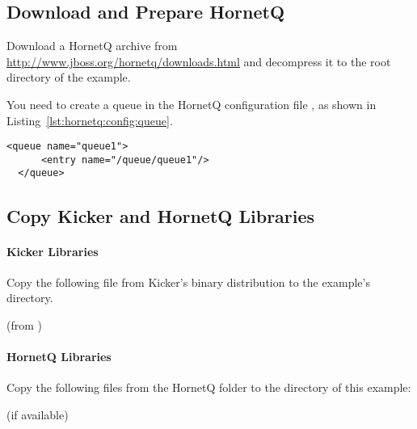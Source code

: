 \subsection{Download and Prepare HornetQ}

Download a HornetQ archive from \url{http://www.jboss.org/hornetq/downloads.html} %
and decompress it to the root directory of the example. 

\noindent You need to create a queue in the HornetQ configuration file %
, as shown in Listing~\ref{lst:hornetq:config:queue}.

\setXMLListing
\begin{lstlisting}[caption=Queue definition to be added to the HornetQ configuration file,label=lst:hornetq:config:queue,numbers=none]
  <queue name="queue1">
      <entry name="/queue/queue1"/>
  </queue>
\end{lstlisting}

\subsection{Copy Kicker and HornetQ Libraries}

\paragraph*{Kicker Libraries}

Copy the following file from Kicker's binary distribution to %
the example's  directory.

\medskip

\begin{compactenum}
 \item \file{\mainJarEMF} (from )
\end{compactenum}

\paragraph*{HornetQ Libraries}

Copy the following files from the HornetQ  folder to the %
 directory of this example:

\medskip

\begin{compactenum}
\item {}
\item {} (if available)
\item {}
\item {}
\item {}
\item {}
\end{compactenum}

